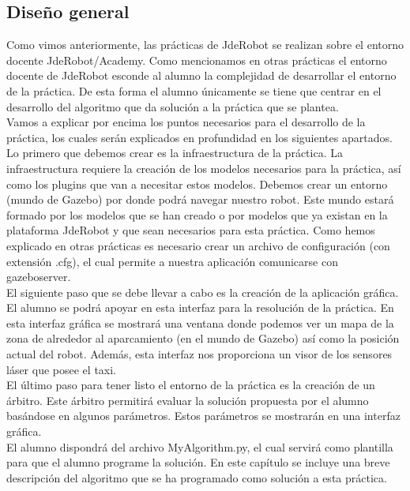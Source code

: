 \subsection{Diseño general}
Como vimos anteriormente, las prácticas de JdeRobot se realizan sobre el entorno docente JdeRobot/Academy. Como mencionamos en otras prácticas el entorno docente de JdeRobot esconde al alumno la complejidad de desarrollar el entorno de la práctica. De esta forma el alumno únicamente se tiene que centrar en el desarrollo del algoritmo que da solución a la práctica que se plantea.\\

Vamos a explicar por encima los puntos necesarios para el desarrollo de la práctica, los cuales serán explicados en profundidad en los siguientes apartados. Lo primero que debemos crear es la infraestructura de la práctica. La infraestructura requiere la creación de los modelos necesarios para la práctica, así como los plugins que van a necesitar estos modelos. Debemos crear un entorno (mundo de Gazebo) por donde podrá navegar nuestro robot. Este mundo estará formado por los modelos que se han creado o por modelos que ya existan en la plataforma JdeRobot y que sean necesarios para esta práctica. Como hemos explicado en otras prácticas es necesario crear un archivo de configuración (con extensión .cfg), el cual permite a nuestra aplicación comunicarse con gazeboserver.\\

El siguiente paso que se debe llevar a cabo es la creación de la aplicación gráfica. El alumno se podrá apoyar en esta interfaz para la resolución de la práctica. En esta interfaz gráfica se mostrará una ventana donde podemos ver un mapa de la zona de alrededor al aparcamiento (en el mundo de Gazebo) así como la posición actual del robot. Además, esta interfaz nos proporciona un visor de los sensores láser que posee el taxi.\\

El último paso para tener listo el entorno de la práctica es la creación de un árbitro. Este árbitro permitirá evaluar la solución propuesta por el alumno basándose en algunos parámetros. Estos parámetros se mostrarán en una interfaz gráfica.\\

El alumno dispondrá del archivo MyAlgorithm.py, el cual servirá como plantilla para que el alumno programe la solución. En este capítulo se incluye una breve descripción del algoritmo que se ha programado como solución a esta práctica.\\

